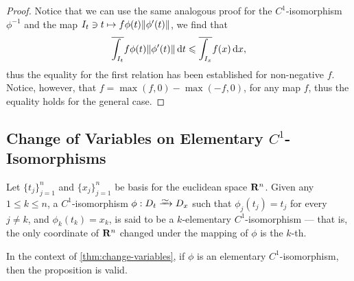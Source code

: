 \begin{proof}
    Notice that we can use the same analogous proof for the \(C^1\)-isomorphism
    \(\phi^{-1}\) and the map \(I_t \ni t \mapsto f \phi(t) \lVert\phi'(t)\rVert\), we
    find that
    \[
        \overline{\int_{I_t}} f \phi(t) \lVert\phi'(t)\rVert\, \mathrm{d} t
        \leqslant \overline{\int_{I_x}} f(x)\, \mathrm{d} x,
    \]
    thus the equality for the first relation has been established for non-negative
    \(f\). Notice, however, that \(f = \max(f, 0) - \max(-f, 0)\), for any map
    \(f\), thus the equality holds for the general case.
\end{proof}

\subsection{Change of Variables on Elementary
    \texorpdfstring{\(C^1\)}{C1}-Isomorphisms}

\begin{definition}
    \label{def:elementary-C1-isomorphism-Rn}
    Let \(\{t_{j}\}_{j=1}^n\) and \(\{x_{j}\}_{j = 1}^n\) be basis for the euclidean
    space \(\mathbf{R}^n\). Given any \(1 \leq k \leq n\), a \(C^1\)-isomorphism \(\phi: D_t
    \isoto D_x\) such that \(\phi_j(t_j) = t_j\) for every \(j \neq k\), and
    \(\phi_k(t_{k}) = x_k\), is said to be a \(k\)-elementary \(C^1\)-isomorphism ---
    that is, the only coordinate of \(\mathbf{R}^n\) changed under the mapping of \(\phi\)
    is the \(k\)-th.
\end{definition}

\begin{lemma}
    \label{lem:change-variables-elementary-C1-isomorphism}
    In the context of \cref{thm:change-variables}, if \(\phi\) is an elementary
    \(C^1\)-isomorphism, then the proposition is valid.
\end{lemma}

